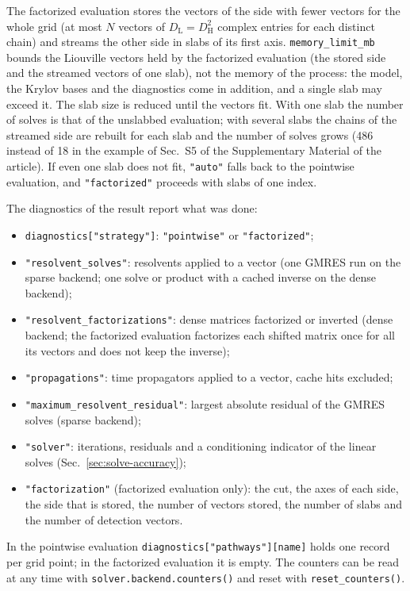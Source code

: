 \documentclass[11pt]{article}
\newcommand{\ArtSISecScaling}{S5}      %
\begin{document}
The factorized evaluation stores the vectors of the side with fewer vectors for the whole grid (at most $N$ vectors of $D_{\mathrm L}=D_{\mathrm H}^2$ complex entries for each distinct chain) and streams the other side in slabs of its first axis. \texttt{memory\_limit\_mb} bounds the Liouville vectors held by the factorized evaluation (the stored side and the streamed vectors of one slab), not the memory of the process: the model, the Krylov bases and the diagnostics come in addition, and a single slab may exceed it. The slab size is reduced until the vectors fit. With one slab the number of solves is that of the unslabbed evaluation; with several slabs the chains of the streamed side are rebuilt for each slab and the number of solves grows (486 instead of 18 in the example of Sec.~\ArtSISecScaling{} of the Supplementary Material of the article). If even one slab does not fit, \texttt{"auto"} falls back to the pointwise evaluation, and \texttt{"factorized"} proceeds with slabs of one index.

The diagnostics of the result report what was done:
\begin{itemize}
    \item \texttt{diagnostics["strategy"]}: \texttt{"pointwise"} or \texttt{"factorized"};
    \item \texttt{"resolvent\_solves"}: resolvents applied to a vector (one GMRES run on the sparse backend; one solve or product with a cached inverse on the dense backend);
    \item \texttt{"resolvent\_factorizations"}: dense matrices factorized or inverted (dense backend; the factorized evaluation factorizes each shifted matrix once for all its vectors and does not keep the inverse);
    \item \texttt{"propagations"}: time propagators applied to a vector, cache hits excluded;
    \item \texttt{"maximum\_resolvent\_residual"}: largest absolute residual of the GMRES solves (sparse backend);
    \item \texttt{"solver"}: iterations, residuals and a conditioning indicator of the linear solves (Sec.~\ref{sec:solve-accuracy});
    \item \texttt{"factorization"} (factorized evaluation only): the cut, the axes of each side, the side that is stored, the number of vectors stored, the number of slabs and the number of detection vectors.
\end{itemize}
In the pointwise evaluation \texttt{diagnostics["pathways"][name]} holds one record per grid point; in the factorized evaluation it is empty. The counters can be read at any time with \texttt{solver.backend.counters()} and reset with \texttt{reset\_counters()}.
\end{document}
